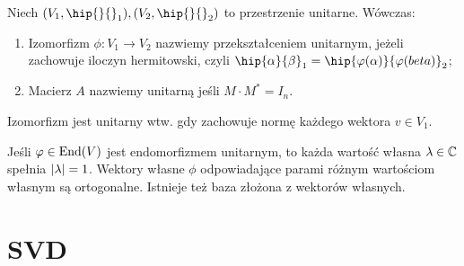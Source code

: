 \documentclass[11pt, a4paper]{article}
\begin{document}
\begin{definition}
	Niech \((V_1, \hip{}{}_1), (V_2, \hip{}{}_2)\) to przestrzenie unitarne.
	Wówczas:
	\begin{enumerate}
		\item Izomorfizm \(\phi: V_1 \to V_2\) nazwiemy przekształceniem unitarnym, jeżeli
		zachowuje iloczyn hermitowski, czyli \(\hip{\alpha}{\beta}_1 = \hip{\phi(\alpha)}{\phi(beta)}_2\);

		\item Macierz \(A\) nazwiemy unitarną jeśli \(M \cdot M^{*} = I_n\).
    \end{enumerate}
\end{definition}

\begin{remark}
	Izomorfizm jest unitarny wtw. gdy zachowuje normę każdego wektora \(v \in V_1\).
\end{remark}

\begin{theorem}
	Jeśli \(\phi \in \textnormal{End}(V)\) jest endomorfizmem unitarnym, to
	każda wartość własna \(\lambda \in \C\) spełnia \(\abs{\lambda} = 1\).
	Wektory własne \(\phi\) odpowiadające parami różnym wartościom własnym są
	ortogonalne. Istnieje też baza złożona z wektorów własnych.
\end{theorem}

\section{SVD}
\end{document}
